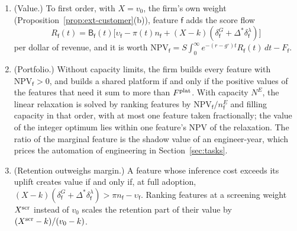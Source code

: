 \begin{proposition}\label{prop:prod-portfolio}
\begin{enumerate}
\item[(a)] (Value.) To first order, with $X=v_0$, the firm's own weight (Proposition~\ref{prop:ext-customer}(b)), feature $\mathsf f$ adds the score flow
\begin{equation}\label{eq:prod-feature}
R_{\mathsf f}(t)=\mathsf B_{\mathsf f}(t)\bigl[\upsilon_{\mathsf f}-\pi(t)n_{\mathsf f}+(X-k)(\delta^G_{\mathsf f}+\Delta^*\delta^\lambda_{\mathsf f})\bigr]
\end{equation}
per dollar of revenue, and it is worth $\mathrm{NPV}_{\mathsf f}=S\int_0^\infty e^{-(r-g^\circ)t}R_{\mathsf f}(t)\,dt-F_{\mathsf f}$.
\item[(b)] (Portfolio.) Without capacity limits, the firm builds every feature with $\mathrm{NPV}_{\mathsf f}>0$, and builds a shared platform if and only if the positive values of the features that need it sum to more than $F^{\rm plat}$. With capacity $N^E$, the linear relaxation is solved by ranking features by $\mathrm{NPV}_{\mathsf f}/n^E_{\mathsf f}$ and filling capacity in that order, with at most one feature taken fractionally; the value of the integer optimum lies within one feature's NPV of the relaxation. The ratio of the marginal feature is the shadow value of an engineer-year, which prices the automation of engineering in Section~\ref{sec:tasks}.
\item[(c)] (Retention outweighs margin.) A feature whose inference cost exceeds its uplift creates value if and only if, at full adoption, $(X-k)(\delta^G_{\mathsf f}+\Delta^*\delta^\lambda_{\mathsf f})>\pi n_{\mathsf f}-\upsilon_{\mathsf f}$. Ranking features at a screening weight $X^{\rm scr}$ instead of $v_0$ scales the retention part of their value by $(X^{\rm scr}-k)/(v_0-k)$.
\end{enumerate}
\end{proposition}


